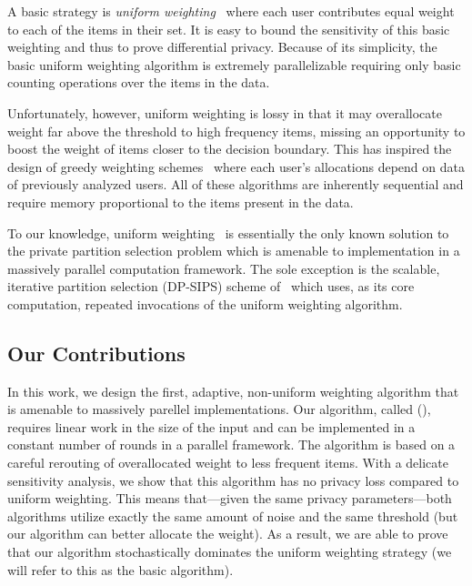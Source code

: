 A basic strategy is {\it uniform weighting}~\cite{korolova2009releasing} where each user  contributes equal weight to each of the items in their set. It is easy to bound the sensitivity of this basic weighting and thus to prove differential privacy. Because of its simplicity, the basic uniform weighting algorithm is extremely parallelizable requiring only basic counting operations over the items in the data.  

Unfortunately, however, uniform weighting is lossy in that it may overallocate weight far above the threshold to high frequency items, missing an opportunity to boost the weight of items closer to the decision boundary. This has inspired the design of greedy weighting schemes~\cite{gopi2020dpunion, carvalho2022incorporatingitem} where each user's allocations depend on data of previously analyzed users. All of these algorithms are inherently sequential and require memory proportional to the items present in the data. 

To our knowledge, uniform weighting~\cite{korolova2009releasing} is essentially the only known solution to the private partition selection problem which is amenable to implementation in a massively parallel computation framework. The sole exception is the scalable, iterative partition selection (DP-SIPS) scheme of~\cite{swanberg2023dpsips} which uses, as its core computation, repeated invocations of the uniform weighting algorithm.

\subsection{Our Contributions}

In this work, we design the first, adaptive, non-uniform weighting algorithm that is amenable to massively parellel implementations. Our algorithm, called \ouralgolong{} (\ouralgo{}), requires linear work in the size of the input and can be implemented in a constant number of rounds in a parallel framework.
The algorithm is based on a careful rerouting of overallocated weight to less frequent items. With a delicate sensitivity analysis, we show that this algorithm has no privacy loss compared to uniform weighting. This means that---given the same privacy parameters---both algorithms utilize exactly the same amount of noise and the same threshold (but our algorithm can better allocate the weight). As a result, we are able to prove that our algorithm stochastically dominates the uniform weighting strategy (we will refer to this as the basic algorithm).

